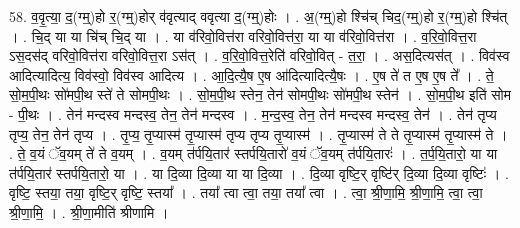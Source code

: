 \documentclass[17pt]{extarticle}
\begin{document}
58. व॒वृ॒त्या॒ द॒(ग्म्॒)हो र॒(ग्म्॒)होर् व॑वृत्याद् ववृत्या द॒(ग्म्॒)होः । . अ॒(ग्म्॒)हो श्चि॑च् चिद॒(ग्म्॒)हो र॒(ग्म्॒)हो श्चि॑त् । . चि॒द् या या चि॑च् चि॒द् या । . या व॑रिवो॒वित्त॑रा वरिवो॒वित्त॑रा॒ या या व॑रिवो॒वित्त॑रा । . व॒रि॒वो॒वित्त॒रा ऽस॒दस॑द् वरिवो॒वित्त॑रा वरिवो॒वित्त॒रा ऽस॑त् । . व॒रि॒वो॒वित्त॒रेति॑ वरिवो॒वित् - त॒रा॒ । . अस॒दित्यस॑त् । . विव॑स्व आदित्यादित्य॒ विव॑स्वो॒ विव॑स्व आदित्य । . आ॒दि॒त्यै॒ष ए॒ष आ॑दित्यादित्यै॒षः । . ए॒ष ते॑ त ए॒ष ए॒ष ते᳚ । . ते॒ सो॒म॒पी॒थः सो॑मपी॒थ स्ते॑ ते सोमपी॒थः । . सो॒म॒पी॒थ स्तेन॒ तेन॑ सोमपी॒थः सो॑मपी॒थ स्तेन॑ । . सो॒म॒पी॒थ इति॑ सोम - पी॒थः । . तेन॑ मन्दस्व मन्दस्व॒ तेन॒ तेन॑ मन्दस्व । . म॒न्द॒स्व॒ तेन॒ तेन॑ मन्दस्व मन्दस्व॒ तेन॑ । . तेन॑ तृप्य तृप्य॒ तेन॒ तेन॑ तृप्य । . तृ॒प्य॒ तृ॒प्यास्म॑ तृ॒प्यास्म॑ तृप्य तृप्य तृ॒प्यास्म॑ । . तृ॒प्यास्म॑ ते ते तृ॒प्यास्म॑ तृ॒प्यास्म॑ ते । . ते॒ व॒यं ॅव॒यम् ते॑ ते व॒यम् । . व॒यम् त॑र्पयि॒तार॑ स्तर्पयि॒तारो॑ व॒यं ॅव॒यम् त॑र्पयि॒तारः॑ । . त॒र्प॒यि॒तारो॒ या या त॑र्पयि॒तार॑ स्तर्पयि॒तारो॒ या । . या दि॒व्या दि॒व्या या या दि॒व्या । . दि॒व्या वृष्टि॒र् वृष्टि॑र् दि॒व्या दि॒व्या वृष्टिः॑ । . वृष्टि॒ स्तया॒ तया॒ वृष्टि॒र् वृष्टि॒ स्तया᳚ । . तया᳚ त्वा त्वा॒ तया॒ तया᳚ त्वा । . त्वा॒ श्री॒णा॒मि॒ श्री॒णा॒मि॒ त्वा॒ त्वा॒ श्री॒णा॒मि॒ । . श्री॒णा॒मीति॑ श्रीणामि । \newline
\end{document}

